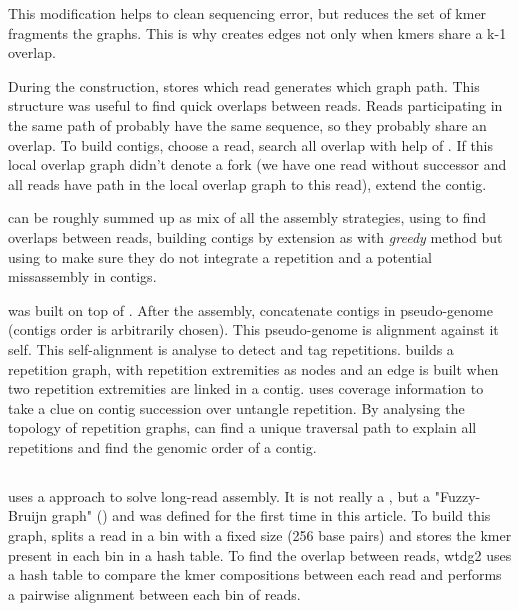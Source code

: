 \documentclass[main]{subfiles}
\begin{document}
This modification helps to clean sequencing error, but reduces the set of kmer fragments the \DBG graphs. This is why  creates edges not only when kmers share a k-1 overlap. 

During the  construction, \abruijn stores which read generates which graph path. This structure was useful to find quick overlaps between reads. Reads participating in the same path of  probably have the same sequence, so they probably share an overlap. To build contigs, \abruijn choose a read, search all overlap with help of . If this local overlap graph didn't denote a fork (we have one read without successor and all reads have path in the local overlap graph to this read), \abruijn extend the contig.

\abruijn can be roughly summed up as mix of all the assembly strategies, using \DBG to find overlaps between reads, building contigs by extension as with \textit{greedy} method but using \OLC to make sure they do not integrate a repetition and a potential missassembly in contigs.

\flye was built on top of \abruijn. After the \abruijn assembly, \flye concatenate \abruijn contigs in pseudo-genome (contigs order is arbitrarily chosen). This pseudo-genome is alignment against it self. This self-alignment is analyse to detect and tag repetitions. \flye builds a repetition graph, with repetition extremities as nodes and an edge is built when two repetition extremities are linked in a contig. \flye uses coverage information to take a clue on contig succession over untangle repetition. By analysing the topology of repetition graphs, \flye can find a unique traversal path to explain all repetitions and find the genomic order of a contig.

\subsection{\wtdbg}

\wtdbg \cite{wtdbg2}  uses a \DBG approach to solve long-read assembly. It is not really a \DBG, but a "Fuzzy-Bruijn graph" () and was defined for the first time in this article. To build this graph, \wtdbg splits a read in a bin with a fixed size (256 base pairs) and stores the kmer present in each bin in a hash table.
To find the overlap between reads, wtdg2 uses a hash table to compare the kmer compositions between each read and performs a pairwise alignment between each bin of reads.
\end{document}
